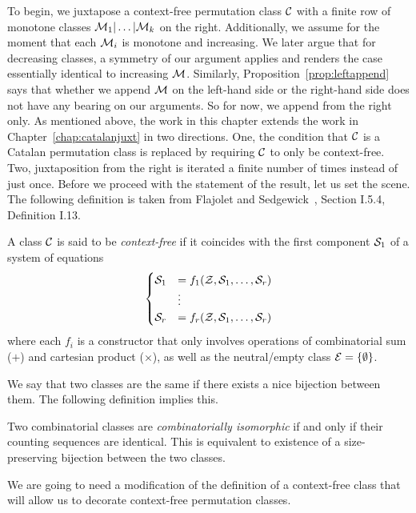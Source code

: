 \documentclass[12pt, a4paper, twoside]{report}
\begin{document}
To begin, we juxtapose a context-free permutation class $\C$ with a finite row of monotone classes $\M_1|\ldots|\M_k$ on the right. Additionally, we assume for the moment that each
$\M_i$ is monotone and increasing. We later argue that for decreasing classes, a symmetry of our argument applies and renders the case essentially identical to increasing $\M$. Similarly, Proposition~\ref{prop:leftappend} says that whether we append $\M$ on the left-hand side or the right-hand side does not have any bearing on our arguments. So for now, we append from the right only. As mentioned above, the work in this chapter extends the work in Chapter~\ref{chap:catalanjuxt} in two directions. One, the condition that $\C$ is a Catalan permutation class is replaced by requiring $\C$ to only be context-free. Two, juxtaposition from the right is iterated a finite number of times instead of just once. Before we proceed with the statement of the result, let us set the scene. The following definition is taken from Flajolet and Sedgewick~\cite{analcomb}, Section I.5.4, Definition I.13.
\begin{definition}
  A class $\C$ is said to be \emph{context-free} if it coincides with the first component $\S_1$ of a system of equations
  \begin{align}
  \begin{aligned}
    \begin{cases}
      \S_1 &= f_1(\Z,\S_1,\ldots,\S_r)\\
      &\vdots\\
      \S_r &= f_r(\Z,\S_1,\ldots,\S_r)
    \end{cases}
  \end{aligned}
  \end{align}
  where each $f_i$ is a constructor that only involves operations of combinatorial sum ($+$) and cartesian product ($\times$), as well as the neutral/empty class $\EE = \{\emptyset\}$.
\end{definition}
We say that two classes are the same if there exists a nice bijection between them. The following definition implies this.
\begin{definition}
  Two combinatorial classes are \emph{combinatorially isomorphic} if and only if their counting sequences are identical. This is equivalent to existence of a size-preserving bijection between the two classes.
\end{definition}
We are going to need a modification of the definition of a context-free class that will allow us to decorate context-free permutation classes. 
\end{document}
